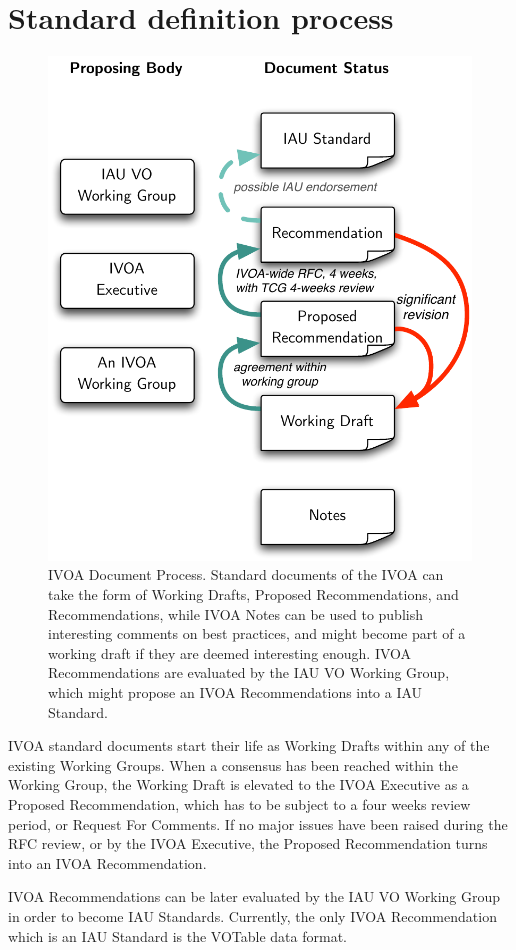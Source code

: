 	\section{Standard definition process} %
	\label{sec:standard_definition_process}
		\begin{figure}[tbp]
			\centering
				\includegraphics[width=0.66\columnwidth]
				{fig/IVOADocumentProcess.pdf}
			\caption[IVOA Document Process]{
				IVOA Document Process. Standard documents of the
				IVOA can take the form of Working Drafts, Proposed
				Recommendations, and Recommendations, while IVOA
				Notes can be used to publish interesting comments
				on best practices, and might become part of a
				working draft if they are deemed interesting
				enough. IVOA Recommendations are evaluated by the
				IAU VO Working Group, which might propose an IVOA
				Recommendations into a IAU Standard.
			}
			\label{fig:fig_IVOADocumentProcess}
		\end{figure}
		
		IVOA standard documents start their life as Working Drafts
		within any of the existing Working Groups. When a consensus
		has been reached within the Working Group, the Working
		Draft is elevated to the IVOA Executive as a Proposed
		Recommendation, which has to be subject to a four weeks
		review period, or Request For Comments. If no major issues
		have been raised during the RFC review, or by the IVOA
		Executive, the Proposed Recommendation turns into an IVOA
		Recommendation.
		
		 IVOA Recommendations can be later evaluated by the IAU VO
		Working Group in order to become IAU Standards. Currently,
		the only IVOA Recommendation which is an IAU Standard is
		the VOTable data format.
		
